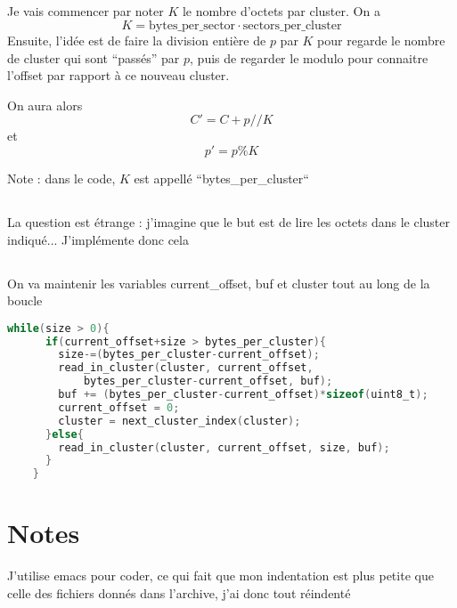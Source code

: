 \documentclass[11pt]{article} %
\begin{document}
\subsection{}
Je vais commencer par noter $K$ le nombre d'octets par cluster. On a 
$$K = \text{bytes\_per\_sector} \cdot \text{sectors\_per\_cluster}$$
Ensuite, l'idée est de faire la division entière de $p$ par $K$ pour regarde le nombre de cluster qui sont ``passés'' par $p$, puis de regarder le modulo pour connaitre l'offset par rapport à ce nouveau cluster.

On aura alors 
$$C' = C + p//K$$ et $$p' = p\%K$$

Note : dans le code, $K$ est appellé ``bytes\_per\_cluster``
\setcounter{subsection}{2}
\subsection{}
La question est étrange : j'imagine que le but est de lire les octets dans le cluster indiqué... J'implémente donc cela
\subsection{}
On va maintenir les variables current\_offset, buf et cluster tout au long de la boucle
\begin{lstlisting}[language=C]
    while(size > 0){
      if(current_offset+size > bytes_per_cluster){
        size-=(bytes_per_cluster-current_offset);
        read_in_cluster(cluster, current_offset, 
			bytes_per_cluster-current_offset, buf);
        buf += (bytes_per_cluster-current_offset)*sizeof(uint8_t); 
        current_offset = 0; 
        cluster = next_cluster_index(cluster); 
      }else{ 
        read_in_cluster(cluster, current_offset, size, buf);
      }
    }

\end{lstlisting}



\section*{Notes}
J'utilise emacs pour coder, ce qui fait que mon indentation est plus petite que celle des fichiers donnés dans l'archive, j'ai donc tout réindenté
\end{document}
